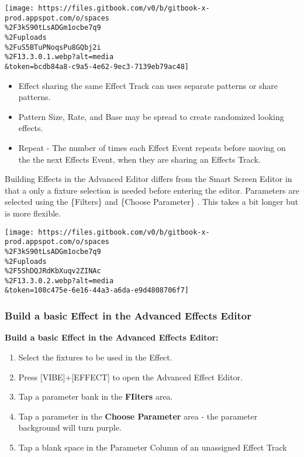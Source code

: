 \documentclass[
]{article}
\begin{document}
\texttt{[image: https://files.gitbook.com/v0/b/gitbook-x-prod.appspot.com/o/spaces\\\%2F3kS90tLsADGm1ocbe7q9\\\%2Fuploads\\\%2FuS5BTuPNoqsPu8GQbj2i\\\%2F13.3.0.1.webp?alt=media\\\&token=bcdb84a8-c9a5-4e62-9ec3-7139eb79ac48]}

\begin{itemize}
\item
  Effect sharing the same Effect Track can uses separate patterns or share patterns.
\item
  Pattern Size, Rate, and Base may be spread to create randomized looking effects.
\item
  Repeat - The number of times each Effect Event repeats before moving on the the next Effects Event, when they are sharing an Effects Track.
\end{itemize}

Building Effects in the Advanced Editor differs from the Smart Screen Editor in that a only a fixture selection is needed before entering the editor. Parameters are selected using the \{Filters\} and \{Choose Parameter\} . This takes a bit longer but is more flexible.

\texttt{[image: https://files.gitbook.com/v0/b/gitbook-x-prod.appspot.com/o/spaces\\\%2F3kS90tLsADGm1ocbe7q9\\\%2Fuploads\\\%2F5ShDQJRdKbXuqv2ZINAc\\\%2F13.3.0.2.webp?alt=media\\\&token=108c475e-6e16-44a3-a6da-e9d4808706f7]}

\hypertarget{build-a-basic-effect-in-the-advanced-effects-editor}{%
\subsubsection{Build a basic Effect in the Advanced Effects Editor}\label{build-a-basic-effect-in-the-advanced-effects-editor}}

\textbf{Build a basic Effect in the Advanced Effects Editor:}

\begin{enumerate}
\def\labelenumi{\arabic{enumi}.}
\item
  Select the fixtures to be used in the Effect.
\item
  Press {[}VIBE{]}+{[}EFFECT{]} to open the Advanced Effect Editor.
\item
  Tap a parameter bank in the \textbf{FIiters} area.
\item
  Tap a parameter in the \textbf{Choose Parameter} area - the parameter background will turn purple.
\item
  Tap a blank space in the Parameter Column of an unassigned Effect Track
\end{enumerate}
\end{document}
